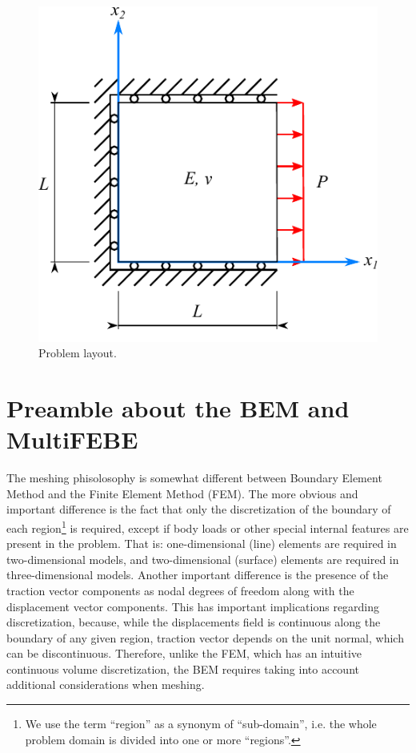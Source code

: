 \documentclass[A4]{article}
\begin{document}
\begin{figure}[h]
	\centering
	\includegraphics{square.pdf}
	\caption{Problem layout.}
	\label{fig:layout}
\end{figure}

\section{Preamble about the BEM and MultiFEBE}

The meshing phisolosophy is somewhat different between Boundary Element Method and the Finite Element Method (FEM). The more obvious and important difference is the fact that only the discretization of the boundary of each region\footnote{We use the term ``region'' as a synonym of ``sub-domain'', i.e. the whole problem domain is divided into one or more ``regions''.} is required, except if body loads or other special internal features are present in the problem. That is: one-dimensional (line) elements are required in two-dimensional models, and two-dimensional (surface) elements are required in three-dimensional models. Another important difference is the presence of the traction vector components as nodal degrees of freedom along with the displacement vector components. This has important implications regarding discretization, because, while the displacements field is continuous along the boundary of any given region, traction vector depends on the unit normal, which can be discontinuous. Therefore, unlike the FEM, which has an intuitive continuous volume discretization, the BEM requires taking into account additional considerations when meshing.
\end{document}
